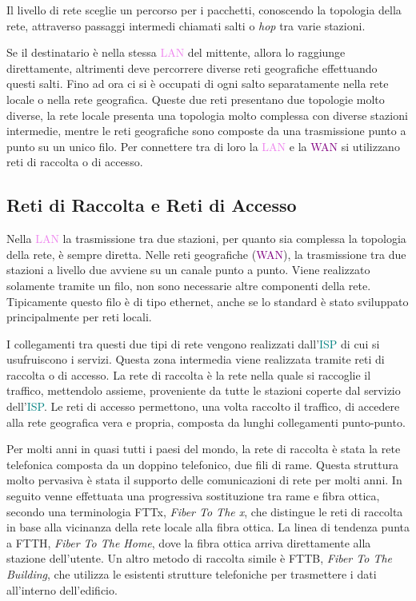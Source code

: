 \documentclass{article}
\numberwithin{equation}{subsection}
\begin{document}
Il livello di rete sceglie un percorso per i pacchetti, conoscendo la topologia della rete, attraverso passaggi intermedi chiamati salti o \textit{hop} tra varie stazioni. 

Se il destinatario è nella stessa \textcolor{violet}{LAN} del mittente, allora lo raggiunge direttamente, altrimenti deve percorrere diverse reti geografiche effettuando questi salti. 
Fino ad ora ci si è occupati di ogni salto separatamente nella rete locale o nella rete geografica. Queste due reti presentano due topologie molto diverse, la rete locale presenta una topologia molto complessa con diverse stazioni intermedie, mentre le reti geografiche sono composte da una trasmissione punto a punto su un unico filo.  
Per connettere tra di loro la \textcolor{violet}{LAN} e la \textcolor{purple}{WAN} si utilizzano reti di raccolta o di accesso. 

\subsection{Reti di Raccolta e Reti di Accesso}

Nella \textcolor{violet}{LAN} la trasmissione tra due stazioni, per quanto sia complessa la topologia della rete, è sempre diretta. Nelle reti geografiche (\textcolor{purple}{WAN}), la trasmissione tra due 
stazioni a livello due avviene su un canale punto a punto. Viene realizzato solamente tramite un filo, non sono necessarie altre componenti della rete. Tipicamente 
questo filo è di tipo ethernet, anche se lo standard è stato sviluppato principalmente per reti locali. 

I collegamenti tra questi due tipi di rete vengono realizzati dall'\textcolor{teal}{ISP} di cui si usufruiscono i servizi. Questa zona intermedia viene realizzata tramite reti di 
raccolta o di accesso. La rete di raccolta è la rete nella quale si raccoglie il traffico, mettendolo assieme, proveniente da tutte le stazioni coperte dal servizio 
dell'\textcolor{teal}{ISP}. Le reti di accesso permettono, una volta raccolto il traffico, di accedere alla rete geografica vera e propria, composta da lunghi collegamenti punto-punto. 


Per molti anni in quasi tutti i paesi del mondo, la rete di raccolta è stata la rete telefonica composta da un doppino telefonico, due fili di rame. Questa struttura molto 
pervasiva è stata il supporto delle comunicazioni di rete per molti anni. 
In seguito venne effettuata una progressiva sostituzione tra rame e fibra ottica, secondo una terminologia FTTx, \textit{Fiber To The x}, che distingue le reti di raccolta in base alla vicinanza della rete locale alla fibra ottica. La linea di tendenza punta a FTTH, \textit{Fiber To The Home}, dove la fibra ottica arriva direttamente alla stazione dell'utente. Un altro metodo di 
raccolta simile è FTTB, \textit{Fiber To The Building}, che utilizza le esistenti strutture telefoniche per trasmettere i dati all'interno dell'edificio. 
\end{document}
